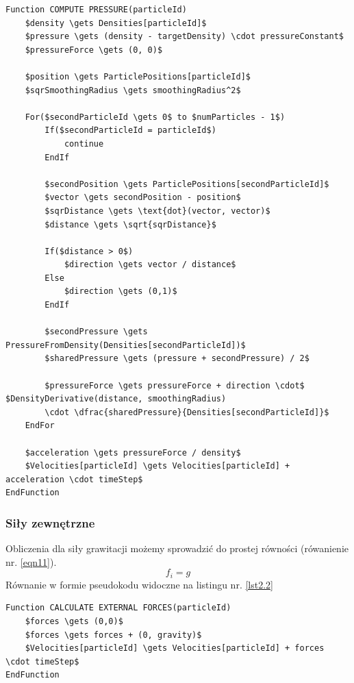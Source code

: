 \documentclass{article}
\begin{document}
\begin{lstlisting}[language=Pseudocode,mathescape=true,caption=Obliczenia ciśnienia,label={lst2.1}]
Function COMPUTE PRESSURE(particleId)
    $density \gets Densities[particleId]$
    $pressure \gets (density - targetDensity) \cdot pressureConstant$
    $pressureForce \gets (0, 0)$

    $position \gets ParticlePositions[particleId]$
    $sqrSmoothingRadius \gets smoothingRadius^2$

    For($secondParticleId \gets 0$ to $numParticles - 1$)
        If($secondParticleId = particleId$)
            continue
        EndIf

        $secondPosition \gets ParticlePositions[secondParticleId]$
        $vector \gets secondPosition - position$
        $sqrDistance \gets \text{dot}(vector, vector)$
        $distance \gets \sqrt{sqrDistance}$

        If($distance > 0$)
            $direction \gets vector / distance$
        Else
            $direction \gets (0,1)$
        EndIf

        $secondPressure \gets PressureFromDensity(Densities[secondParticleId])$
        $sharedPressure \gets (pressure + secondPressure) / 2$

        $pressureForce \gets pressureForce + direction \cdot$ $DensityDerivative(distance, smoothingRadius)
        \cdot \dfrac{sharedPressure}{Densities[secondParticleId]}$
    EndFor

    $acceleration \gets pressureForce / density$
    $Velocities[particleId] \gets Velocities[particleId] + acceleration \cdot timeStep$
EndFunction
\end{lstlisting}

\newpage
\subsubsection{Siły zewnętrzne}
Obliczenia dla siły grawitacji możemy sprowadzić do prostej równości (rówanienie nr. \ref{eqn11}).\newline
\begin{equation}\label{eqn11}
f_i = g
\end{equation}
\noindent
Równanie w formie pseudokodu widoczne na listingu nr. \ref{lst2.2}\newline
\begin{lstlisting}[language=Pseudocode,mathescape=true,caption=Siły zewnętrzne,label={lst2.2}]
Function CALCULATE EXTERNAL FORCES(particleId)
    $forces \gets (0,0)$
    $forces \gets forces + (0, gravity)$
    $Velocities[particleId] \gets Velocities[particleId] + forces \cdot timeStep$
EndFunction
\end{lstlisting}
\end{document}
